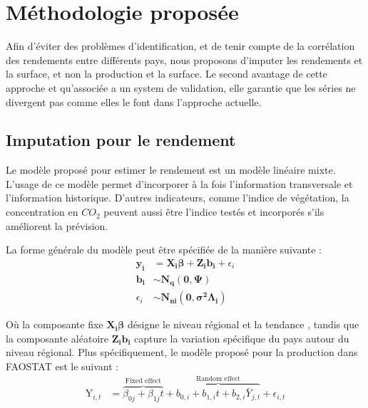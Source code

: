 \documentclass[nojss]{jss}\usepackage{graphicx, color}
\begin{document}
\section{M\'{e}thodologie propos\'{e}e}

Afin d'\'{e}viter des probl\`{e}mes d'identification, et de tenir
compte de la corr\'{e}lation des rendements entre diff\'{e}rents pays,
nous proposons d'imputer les rendements et la surface, et non la
production et la surface. Le second avantage de cette approche et
qu'associ\'{e}e a un system de validation, elle garantie que les
s\'{e}ries ne divergent pas comme elles le font dans l'approche
actuelle.

\subsection{Imputation pour le rendement}
Le mod\`{e}le propos\'{e} pour estimer le rendement est un mod\`{e}le
lin\'{e}aire mixte. L'usage de ce mod\`{e}le permet d'incorporer \`{a}
la fois l'information transversale et l'information
historique. D'autres indicateurs, comme l'indice de
v\'{e}g\'{e}tation, la concentration en $CO_2$ peuvent aussi \^{e}tre
l'indice test\'{e}s et incorpor\'{e}s s\'{}ils am\'{e}liorent la
pr\'{e}vision.

La forme g\'{e}n\'{e}rale du mod\`{e}le peut \^{e}tre
sp\'{e}cifi\'{e}e de la mani\`{e}re suivante :
\begin{align}
  \mathbf{y_i} &= \mathbf{X_i}\boldsymbol{\beta} +
  \mathbf{Z_i}\mathbf{b_i} + \epsilon_i \nonumber\\
  \mathbf{b_i} &\sim \mathbf{N_q}(\mathbf{0}, \boldsymbol{\Psi})\nonumber\\
  \epsilon_i &\sim \mathbf{N_{ni}}(\mathbf{0},
  \boldsymbol{\sigma^2}\boldsymbol{\Lambda_i})
\end{align}

O\`{u} la composante fixe $\mathbf{X_i}\boldsymbol{\beta}$ d\'{e}signe
le niveau r\'{e}gional et la tendance , tandis que la composante
al\'{e}atoire $\mathbf{Z_i}\mathbf{b_i}$ capture la variation
sp\'{e}cifique du pays autour du niveau r\'{e}gional. Plus
sp\'{e}cifiquement, le mod\`{e}le propos\'{e} pour la production dans
FAOSTAT est le suivant :
\begin{align}
  \label{eq:lmeImpute}
  \text{Y}_{i,t} &= \overbrace{\beta_{0j} + \beta_{1j}t}^{\text{Fixed
      effect}} + \overbrace{b_{0,i} + b_{1,i}t +
    b_{2,i}\bar{Y}_{j,t}}^{\text{Random effect}} + \epsilon_{i,t}
\end{align}
\end{document}
